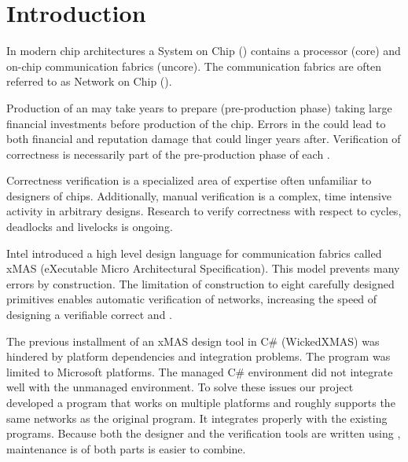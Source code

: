 \chapter*{Introduction}

In modern chip architectures a System on Chip (\Soc) contains a processor (core) and 
on-chip communication fabrics (uncore). The communication fabrics are often referred 
to as Network on Chip (\Noc).

Production of an \Noc may take years to prepare (pre-production phase) taking large financial investments
before production of the chip. Errors in the \Noc could lead to both financial and reputation 
damage that could linger years after. Verification of correctness is necessarily part of the 
pre-production phase of each \Noc.

Correctness verification is a specialized area of expertise often unfamiliar to designers of chips.
Additionally, manual verification is a complex, time intensive activity in arbitrary designs.
Research to verify correctness with respect to cycles, deadlocks and livelocks is ongoing. 

Intel introduced a high level design language for communication fabrics called xMAS (eXecutable 
Micro Architectural Specification). This model prevents many errors by 
construction\cite{DBLP:journals/dt/ChatterjeeKO12}. The limitation of construction to eight 
carefully designed primitives enables automatic verification of networks, increasing the 
speed of designing a verifiable correct \Noc and \Soc.

The previous installment of an xMAS design tool in C\# (WickedXMAS) was hindered by platform 
dependencies and \cpp integration problems. The program was limited to Microsoft platforms. The
managed C\# environment did not integrate well with the unmanaged \cpp environment.
To solve these issues our project developed a program that works on multiple platforms and 
roughly supports the same networks as the original program. It integrates properly with the existing \cpp 
programs. Because both the \xmas designer and the verification tools are written 
using \cpp, maintenance is of both parts is easier to combine.

